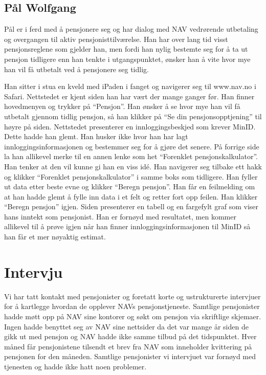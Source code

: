 \documentclass[informationsecurity]{gucmasterproject}
\begin{document}
\subsection{Pål Wolfgang}
Pål er i ferd med å pensjonere seg og har dialog med NAV vedrørende utbetaling og overgangen til aktiv pensjonisttilværelse. Han har over lang tid visst pensjonsreglene som gjelder han, men fordi han nylig bestemte seg for å ta ut pensjon tidligere enn han tenkte i utgangspunktet, ønsker han å vite hvor mye han vil få utbetalt ved å pensjonere seg tidlig.

Han sitter i stua en kveld med iPaden i fanget og navigerer seg til www.nav.no i Safari. Nettstedet er kjent siden han har vært der mange ganger før. Han finner hovedmenyen og trykker på “Pensjon”. Han ønsker å se hvor mye han vil få utbetalt gjennom tidlig pensjon, så han klikker på “Se din pensjonsopptjening” til høyre på siden. Nettstedet presenterer en innloggingsbeskjed som krever MinID. Dette hadde han glemt. Han husker ikke hvor han har lagt innloggingsinformasjonen og bestemmer seg for å gjøre det senere. På forrige side la han allikevel merke til en annen lenke som het “Forenklet pensjonskalkulator”. Han tenker at den vil kunne gi han en viss idé. Han navigerer seg tilbake ett hakk og klikker “Forenklet pensjonskalkulator” i samme boks som tidligere. Han fyller ut data etter beste evne og klikker “Beregn pensjon”. Han får en feilmelding om at han hadde glemt å fylle inn data i et felt og retter fort opp feilen. Han klikker “Beregn pensjon” igjen. Siden presenterer en tabell og en fargefylt graf som viser hans inntekt som pensjonist. Han er fornøyd med resultatet, men kommer allikevel til å prøve igjen når han finner innloggingsinformasjonen til MinID så han får et mer nøyaktig estimat.

\section{Intervju}
Vi har tatt kontakt med pensjonister og foretatt korte og ustrukturerte intervjuer for å kartlegge hvordan de opplever NAVs pensjonstjeneste. Samtlige pensjonister hadde møtt opp på NAV sine kontorer og søkt om pensjon via skriftlige skjemaer. Ingen hadde benyttet seg av NAV sine nettsider da det var mange år siden de gikk ut med pensjon og NAV hadde ikke samme tilbud på det tidspunktet. Hver måned får pensjonistene tilsendt et brev fra NAV som inneholder kvittering på pensjonen for den måneden. Samtlige pensjonister vi intervjuet var fornøyd med tjenesten og hadde ikke hatt noen problemer.
\end{document}
